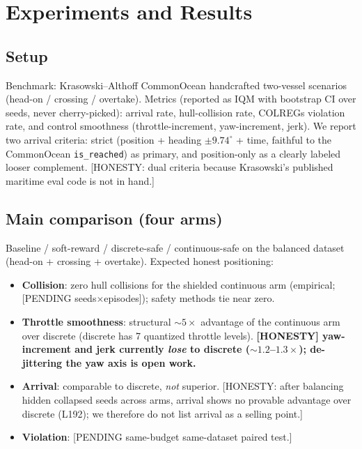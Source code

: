 \documentclass[12pt,letterpaper]{article}
\theoremstyle{remark}\newtheorem*{scope}{Scope and honest limits}
\begin{document}


\section{Experiments and Results}
\label{sec:results}
\subsection{Setup}
Benchmark: Krasowski--Althoff CommonOcean handcrafted two-vessel scenarios
(head-on / crossing / overtake). Metrics (reported as IQM with bootstrap CI over
seeds, never cherry-picked): arrival rate, hull-collision rate, COLREGs violation
rate, and control smoothness (throttle-increment, yaw-increment, jerk). We report
two arrival criteria: strict (position + heading $\pm9.74^\circ$ + time, faithful
to the CommonOcean \texttt{is\_reached}) as primary, and position-only as a clearly
labeled looser complement. [HONESTY: dual criteria because Krasowski's published
maritime eval code is not in hand.]

\subsection{Main comparison (four arms)}
Baseline / soft-reward / discrete-safe / continuous-safe on the balanced dataset
(head-on + crossing + overtake). Expected honest positioning:
\begin{itemize}
  \item \textbf{Collision}: zero hull collisions for the shielded continuous arm
  (empirical; [PENDING seeds$\times$episodes]); safety methods tie near zero.
  \item \textbf{Throttle smoothness}: structural $\sim\!5\times$ advantage of the
  continuous arm over discrete (discrete has 7 quantized throttle levels).
  \textbf{[HONESTY] yaw-increment and jerk currently \emph{lose} to discrete
  ($\sim\!1.2$--$1.3\times$); de-jittering the yaw axis is open work.}
  \item \textbf{Arrival}: comparable to discrete, \emph{not} superior.
  [HONESTY: after balancing hidden collapsed seeds across arms, arrival shows no
  provable advantage over discrete (L192); we therefore do not list arrival as a
  selling point.]
  \item \textbf{Violation}: [PENDING same-budget same-dataset paired test.]
\end{itemize}
\end{document}
